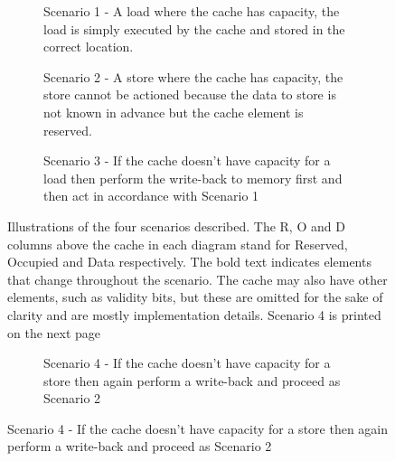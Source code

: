 \begin{figure}[htbp]
	\begin{center}
		\begin{subfigure}[b]{\textwidth}
			\begin{center}
				
				\caption{Scenario 1 - A load where the cache has capacity, the load is simply executed by the cache and stored in the correct location.}
			\end{center}
		\end{subfigure}
		\begin{subfigure}[b]{\textwidth}
			\begin{center}
				
				\caption{Scenario 2 - A store where the cache has capacity, the store cannot be actioned because the data to store is not known in advance but the cache element is reserved.}
			\end{center}
		\end{subfigure}
		\begin{subfigure}[b]{\textwidth}
			\begin{center}
				
				\caption{Scenario 3 - If the cache doesn't have capacity for a load then perform the write-back to memory first and then act in accordance with Scenario 1}
			\end{center}
		\end{subfigure}
	\caption{Illustrations of the four scenarios described. The R, O and D columns above the cache in each diagram stand for Reserved, Occupied and Data respectively. The bold text indicates elements that change throughout the scenario. The cache may also have other elements, such as validity bits, but these are omitted for the sake of clarity and are mostly implementation details. Scenario 4 is printed on the next page}
	\label{fig:scenarios}
	\end{center}
\end{figure}
\begin{figure}\ContinuedFloat
	\begin{center}
    	\begin{subfigure}[b]{\textwidth}
    		\begin{center}
    			
    			\caption{Scenario 4 - If the cache doesn't have capacity for a store then again perform a write-back and proceed as Scenario 2}
    		\end{center}
    	\end{subfigure}
	\end{center}
\end{figure}

